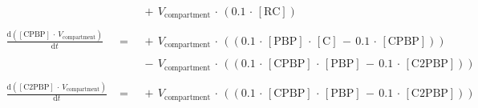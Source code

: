 $$\begin{array}{ccl}
 \; && \;  { \, + \, {V}_{\mathrm{compartment}} \, \cdot \, \left( {{0.1} \, \cdot \, {\mathrm{[RC]}} } \right) } \\ 
 && \\ 
\frac {\mathrm{d}\left( {{\mathrm{[CPBP]}} \, \cdot \, {V}_{\mathrm{compartment}} } \right) }  {\mathrm{d}{t} }  \; &=& \;  { \, + \, {V}_{\mathrm{compartment}} \, \cdot \, \left(\left( {{0.1} \, \cdot \, {\mathrm{[PBP]}} \, \cdot \, {\mathrm{[C]}} \, - \, {0.1} \, \cdot \, {\mathrm{[CPBP]}} } \right)\right) } \\ 
 && \\ 
 \; && \;  { \, - \, {V}_{\mathrm{compartment}} \, \cdot \, \left(\left( {{0.1} \, \cdot \, {\mathrm{[CPBP]}} \, \cdot \, {\mathrm{[PBP]}} \, - \, {0.1} \, \cdot \, {\mathrm{[C2PBP]}} } \right)\right) } \\ 
 && \\ 
\frac {\mathrm{d}\left( {{\mathrm{[C2PBP]}} \, \cdot \, {V}_{\mathrm{compartment}} } \right) }  {\mathrm{d}{t} }  \; &=& \;  { \, + \, {V}_{\mathrm{compartment}} \, \cdot \, \left(\left( {{0.1} \, \cdot \, {\mathrm{[CPBP]}} \, \cdot \, {\mathrm{[PBP]}} \, - \, {0.1} \, \cdot \, {\mathrm{[C2PBP]}} } \right)\right) } \\ 
 && \\ 
\end{array}
$$